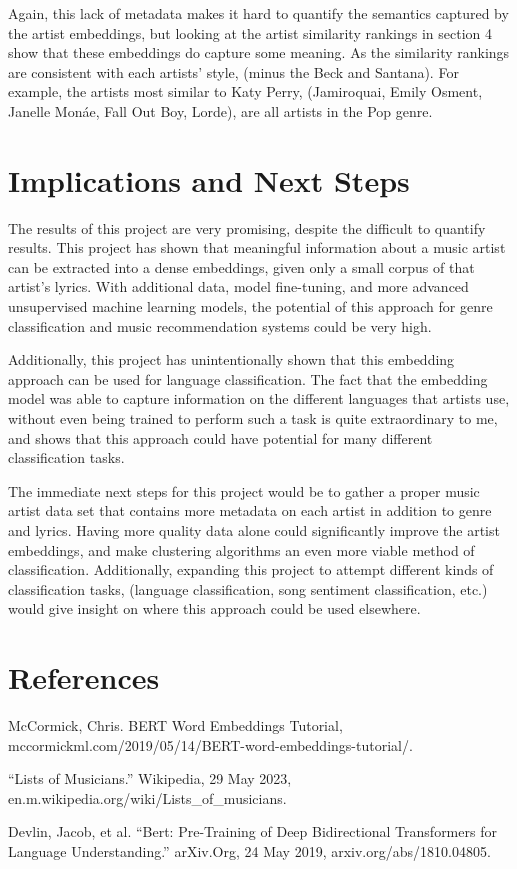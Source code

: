 \documentclass[11pt,a4paper]{article}
\begin{document}
Again, this lack of metadata makes it hard to quantify the semantics captured by the artist embeddings, but looking at the artist similarity rankings in section 4 show that these embeddings do capture some meaning. As the similarity rankings are consistent with each artists' style, (minus the Beck and Santana). For example, the artists most similar to Katy Perry, (Jamiroquai, Emily Osment, Janelle Monáe, Fall Out Boy, Lorde), are all artists in the Pop genre. 

\section{Implications and Next Steps}

 The results of this project are very promising, despite the difficult to quantify results. This project has shown that meaningful information about a music artist can be extracted into a dense embeddings, given only a small corpus of that artist's lyrics. With additional data, model fine-tuning, and more advanced unsupervised machine learning models, the potential of this approach for genre classification and music recommendation systems could be very high.
 
 Additionally, this project has unintentionally shown that this embedding approach can be used for language classification. The fact that the embedding model was able to capture information on the different languages that artists use, without even being trained to perform such a task is quite extraordinary to me, and shows that this approach could have potential for many different classification tasks.

 The immediate next steps for this project would be to gather a proper music artist data set that contains more metadata on each artist in addition to genre and lyrics. Having more quality data alone could significantly improve the artist embeddings, and make clustering algorithms an even more viable method of classification. Additionally, expanding this project to attempt different kinds of classification tasks, (language classification, song sentiment classification, etc.) would give insight on where this approach could be used elsewhere.

 \section{References}


 McCormick, Chris. BERT Word Embeddings Tutorial, mccormickml.com/2019/05/14/BERT-word-embeddings-tutorial/. 
\vspace{0.5cm}

“Lists of Musicians.” Wikipedia, 29 May 2023, en.m.wikipedia.org/wiki/Lists\_of\_musicians.
\vspace{0.5cm}

Devlin, Jacob, et al. “Bert: Pre-Training of Deep Bidirectional Transformers for Language Understanding.” arXiv.Org, 24 May 2019, arxiv.org/abs/1810.04805. 
\end{document}
